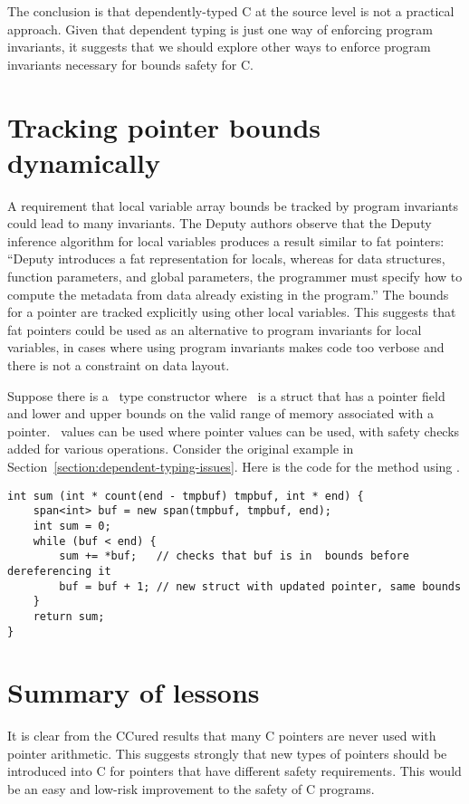 The conclusion is that dependently-typed C at the source level is
not a practical approach. Given that dependent typing is just one way of 
enforcing program invariants,
it suggests that we should explore other ways to enforce program
invariants necessary for bounds safety for C.

\section{Tracking pointer bounds dynamically}

A requirement that local variable array bounds be tracked by program
invariants could lead to many invariants. The Deputy authors observe
that the Deputy inference algorithm for local variables produces a
result similar to fat pointers: ``Deputy introduces a fat representation
for locals, whereas for data structures, function parameters, and global
parameters, the programmer must specify how to compute the metadata from
data already existing in the program.'' The bounds for a pointer are
tracked explicitly using other local variables. This suggests that fat
pointers could be used as an alternative to program invariants for local
variables, in cases where using program invariants makes code too
verbose and there is not a constraint on data layout.

Suppose there is a \spanptr\ type constructor where
\spanptr\ is a struct that has a pointer field and lower and
upper bounds on the valid range of memory associated with a pointer.
\spanptr\ values can be used where pointer values can be
used, with safety checks added for various operations. Consider the
original example in Section~\ref{section:dependent-typing-issues}. 
Here is the code for the method using
\spanptr.

\begin{verbatim}
int sum (int * count(end - tmpbuf) tmpbuf, int * end) {
    span<int> buf = new span(tmpbuf, tmpbuf, end);
    int sum = 0;
    while (buf < end) {
        sum += *buf;   // checks that buf is in  bounds before dereferencing it        
        buf = buf + 1; // new struct with updated pointer, same bounds
    }
    return sum;
}
\end{verbatim}

\section{Summary of lessons}

It is clear from the CCured results that many C pointers are never used
with pointer arithmetic. This suggests strongly that new types of
pointers should be introduced into C for pointers that have different
safety requirements. This would be an easy and low-risk improvement to
the safety of C programs.

